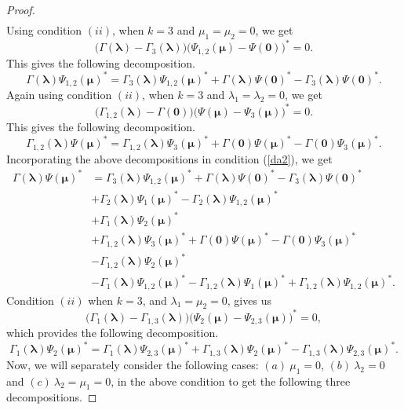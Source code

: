 \documentclass[10pt,a4paper]{amsart}
\begin{document}
\begin{proof}
\begin{equation}
\begin{split}
\end{split}
\end{equation}
Using condition $(ii)$, when $k=3$ and $\mu_1=\mu_2=0$, we get
\[
\big( \Gamma(\bm{\lambda}) - \Gamma_3(\bm{\lambda}) \big) \big( \Psi_{1,2}(\bm{\mu}) - \Psi (\bm{0}) \big)^* = 0.
\]
This gives the following decomposition.
\[
 \Gamma(\bm{\lambda})\Psi_{1,2}(\bm{\mu})^* =    \Gamma_3(\bm{\lambda}) \Psi_{1,2}(\bm{\mu})^* + \Gamma(\bm{\lambda}) \Psi(\bm{0})^* - \Gamma_3(\bm{\lambda}) \Psi(\bm{0})^*.
\]
Again using condition $(ii)$, when $k=3$ and $\lambda_1 = \lambda_2 = 0$, we get
\[
\big( \Gamma_{1,2}(\bm{\lambda}) - \Gamma (\bm{0}) \big) \big( \Psi(\bm{\mu}) - \Psi_3(\bm{\mu}) \big)^* = 0.
\]
This gives the following decomposition.
\[
\Gamma_{1,2}(\bm{\lambda}) \Psi(\bm{\mu})^* = \Gamma_{1,2}(\bm{\lambda})\Psi_{3}(\bm{\mu})^* + \Gamma(\bm{0})\Psi(\bm{\mu})^* - \Gamma(\bm{0})  \Psi_{3}(\bm{\mu})^*.
\]
Incorporating the above decompositions in condition (\ref{da2}), we get
\begin{equation}\label{da3}
\begin{split}
\Gamma(\bm{\lambda})  \Psi(\bm{\mu})^* &=  \Gamma_3(\bm{\lambda}) \Psi_{1,2}(\bm{\mu})^* + \Gamma(\bm{\lambda}) \Psi(\bm{0})^* - \Gamma_3(\bm{\lambda}) \Psi(\bm{0})^* \\
&+ \Gamma_2(\bm{\lambda}) \Psi_1(\bm{\mu})^* - \Gamma_2(\bm{\lambda}) \Psi_{1,2}(\bm{\mu})^* \\
&+ \Gamma_1(\bm{\lambda})\Psi_2(\bm{\mu})^*\\ 
&+ \Gamma_{1,2}(\bm{\lambda})\Psi_{3}(\bm{\mu})^* + \Gamma(\bm{0})\Psi(\bm{\mu})^* - \Gamma(\bm{0})  \Psi_{3}(\bm{\mu})^*\\
&- \Gamma_{1,2}(\bm{\lambda}) \Psi_{2}(\bm{\mu})^* \\
&- \Gamma_1(\bm{\lambda}) \Psi_{1,2}(\bm{\mu})^*
- \Gamma_{1,2}(\bm{\lambda})  \Psi_{1}(\bm{\mu})^* + \Gamma_{1,2}(\bm{\lambda}) \Psi_{1,2}(\bm{\mu})^*.
\end{split}
\end{equation}
Condition $(ii)$ when $k=3$, and $\lambda_1 = \mu_2 = 0$, gives us
\[
\big( \Gamma_{1}(\bm{\lambda}) - \Gamma_{1,3}(\bm{\lambda}) \big) \big( \Psi_2(\bm{\mu}) - \Psi_{2,3}(\bm{\mu}) \big)^* = 0,
\]
which provides the following decomposition.
\[
\Gamma_1(\bm{\lambda}) \Psi_{2}(\bm{\mu})^* = \Gamma_1(\bm{\lambda})  \Psi_{2,3}(\bm{\mu})^* +  \Gamma_{1,3}(\bm{\lambda}) \Psi_{2}(\bm{\mu})^* - \Gamma_{1,3}(\bm{\lambda}) \Psi_{2,3}(\bm{\mu})^*.
\]
Now, we will separately consider the following cases: $(a)~\mu_1 = 0 $, $(b)~\lambda_2 = 0$ and $(c)~\lambda_2 = \mu_1 = 0$, in the above condition to get the following three decompositions.

\end{proof}
\end{document}
